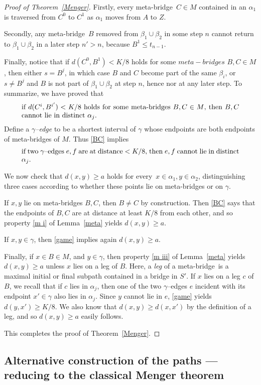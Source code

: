 \documentclass[a4paper]{article}
\newcommand{\defi}[1]{{\color{darkgray}\emph{#1}}}
\newcommand{\Lr}[1]{Lemma~\ref{#1}}
\newcommand{\Tr}[1]{Theorem~\ref{#1}}
\newcommand{\fe}{for every}
\newcommand{\labtequ}[2]{\begin{equation} \label{#1} 	\begin{minipage}[c]{0.9\textwidth}  #2 \end{minipage} \ignorespacesafterend \end{equation} }
\newcommand{\mb}{meta-bridge}
\newcommand{\game}{$\gamma$--edge}
\begin{document}
\begin{proof}[Proof of \Tr{Menger}]
Firstly, every \mb\ $C\in M$ contained in an $\alpha _1$ is traversed from $C^0$ to $C^1$ as $\alpha _1$ moves from $A$ to $Z$. 

Secondly, any \mb\ $B$ removed from $\beta_1 \cup \beta_2$ in some step $n$ cannot return to $\beta_1 \cup \beta_2$ in a later step $n'>n$, because $B^1\leq t_{n-1}$.

Finally, notice that if $d(C^0,B^1) < K/8$ holds for some $\mb s$ $B,C\in M$,  then either $s= B^j$, in which case $B$ and $C$ become part of the same $\beta_i$,  or $s\neq B^j$ and $B$ is not part of $\beta_1 \cup \beta_2$ at step $n$, hence nor at any later step. To summarize, we have proved that 
\labtequ{BC}{if $d(C^i,B^{i'}) < K/8$ holds for some \mb s $B,C\in M$, then $B,C$ cannot lie in distinct $\alpha_j$.}
Define a \defi{\game} to be a shortest interval of $\gamma$ whose endpoints are both endpoints of \mb s of $M$. Thus \eqref{BC} implies
\labtequ{game}{if two \game s $e,f$ are at distance $< K/8$, then $e,f$ cannot lie in distinct $\alpha_j$.}


We now check that $d(x,y)\geq a$ holds \fe\ $x\in \alpha_1, y\in \alpha _2$, distinguishing three cases according to whether these points lie on \mb s or on $\gamma$.

If $x,y$ lie on  \mb s $B,C$, then $B\neq C$ by construction. Then \eqref{BC} says that the endpoints of $B,C$ are at distance at least $K/8$ from each other, and so property \ref{m i} of \Lr{meta} yields $d(x,y)\geq a$.

If $x,y\in \gamma$, then \eqref{game} implies again $d(x,y)\geq a$.

Finally, if  $x \in B \in M$, and $y\in \gamma$, then property \ref{m iii} of \Lr{meta} yields $d(x,y)\geq a$ unless $x$ lies on a leg of $B$. Here, a \defi{leg} of a \mb\ is a maximal initial or final subpath contained in a bridge in $S'$. If $x$ lies on a leg $c$ of $B$, we recall that if  $c$ lies in $\alpha_j$, then one of the two \game s $e$ incident with its endpoint $x'\in \gamma$ also lies in $\alpha_j$. Since $y$ cannot lie in $e$, \eqref{game} yields $d(y,x')\geq K/8$. We also know that $d(x,y)\geq d(x,x')$ by the definition of a leg, and so  $d(x,y)\geq a$ easily follows.

This completes the proof of \Tr{Menger}. 
\end{proof}





\subsection{Alternative construction of the paths --- reducing to the classical Menger theorem}
\end{document}
